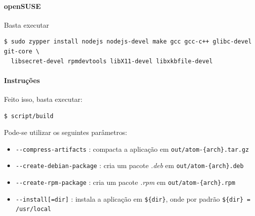 	\paragraph{openSUSE}
	Basta executar
	\begin{Verbatim}[fontsize=\footnotesize]
$ sudo zypper install nodejs nodejs-devel make gcc gcc-c++ glibc-devel git-core \
  libsecret-devel rpmdevtools libX11-devel libxkbfile-devel
	\end{Verbatim}

	\paragraph{Instruções}
	Feito isso, basta executar:
	\begin{Verbatim}[fontsize=\footnotesize]
$ script/build
	\end{Verbatim}
	Pode-se utilizar os seguintes parâmetros:
	\begin{itemize}
		\item \verb|--compress-artifacts| : compacta a aplicação em \verb|out/atom-{arch}.tar.gz|
		\item \verb|--create-debian-package| : cria um pacote \textit{.deb} em \verb|out/atom-{arch}.deb|
		\item \verb|--create-rpm-package| : cria um pacote \textit{.rpm} em \verb|out/atom-{arch}.rpm|
		\item \verb|--install[=dir]| : instala a aplicação em \verb|${dir}|, onde por padrão \verb|${dir} = /usr/local|
	\end{itemize}

	
	


